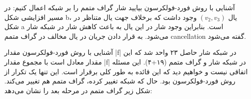 \begin{itemframe}{آشنایی با روش فورد-فولکرسون}
\itm
بیایید شار گراف متمم را بر شبکه اعمال کنیم:
\itm
در مسیر افزایشی شکل b، یال
$(v_2, v_3)$
وجود داشت که برخلاف جهت یال متناظر در شکل a است. بنابراین وجود شار در این یال به باعث کاهش شار در شبکه شار می‌شود. به قرار دادن جریان در یال مخالف در گراف متمم cancellation گفته می‌شود.
\end{itemframe}


\begin{itemframe}{آشنایی با روش فورد-فولکرسون}
\itm
مقدار |f| در شبکه شار حاصل ۲۳ واحد شد که این مقدار معادل است با مجموع مقدار |f| در شبکه شار و گراف متمم (۱۹‌+۴). این مسئله اتفاقی نیست و خواهیم دید که این قائده به طور کلی برقرار است.
\itm
این تنها یک تکرار از روش فورد-فولکرسون بود. حال که شبکه تغییر کرده، گراف متمم هم تغییر می‌کند. شکل زیر گراف متمم در مرحله بعد را نشان می‌دهد:
\end{itemframe}
